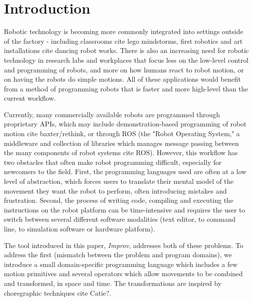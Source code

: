 \documentclass[sigconf]{acmart}
\begin{document}
%
%



\maketitle


\section{Introduction}\label{introduction}

Robotic technology is becoming more commonly integrated into settings outside of
the factory - including classrooms {\color{red} cite lego mindstorms, first 
robotics} and art installations {\color{red} cite dancing robot works}. There
is also an increasing need for robotic technology in research labs and
workplaces that
focus less on the low-level control and programming of robots, and more on how
humans react to robot motion, or on having the robots do simple motions. All of
these applications would benefit from a method of programming robots that is
faster and more high-level than the current workflow.


Currently, many commercially available robots are programmed through proprietary
APIs, which may include demonstration-based programming of robot motion
{\color{red} cite baxter/rethink}, or through ROS (the "Robot Operating System,"
a middleware and collection of libraries which manages message passing between
the many components of robot systems {\color{red} cite ROS}). However, this
workflow has two obstacles that often make robot programming difficult,
especially for newcomers to the field. First, the programming languages used are
often at a low level of abstraction, which forces users to translate their
mental model of the movement they want the robot to perform, often introducing
mistakes and frustration. Second, the process of writing code, compiling and
executing the instructions on the robot platform can be time-intensive and
requires the user to switch between several different software modalities (text
editor, to command line, to simulation software or hardware platform).

The tool introduced in this paper, \emph{Improv}, addresses both of these
problems. To address the first (mismatch between the problem and
program domains), we introduce a small domain-specific programming language
which includes a few motion primitives and several operators which allow
movements to be combined and transformed, in space and time. The transformations
are inspired by choregraphic techniques {\color{red} cite Catie?}. 
\end{document}
